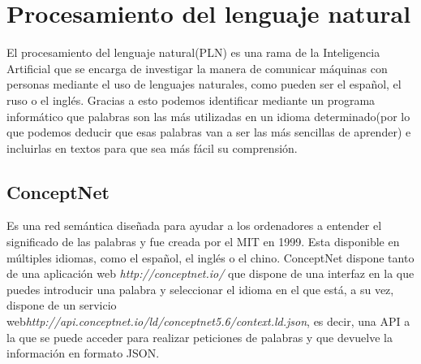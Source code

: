 \section{Procesamiento del lenguaje natural}
El procesamiento del lenguaje natural(PLN) es una rama de la Inteligencia Artificial que se encarga de investigar la manera de comunicar máquinas con personas mediante el uso de lenguajes naturales, como pueden ser el español, el ruso o el inglés. Gracias a esto podemos identificar mediante un programa informático que palabras son las más utilizadas en un idioma determinado(por lo que podemos deducir que esas palabras van a ser las más sencillas de aprender) e incluirlas en textos para que sea más fácil su comprensión.

\subsection{ConceptNet} 

Es una red semántica diseñada para ayudar a los ordenadores a entender el significado de las palabras y fue creada por el MIT en 1999. Esta disponible en múltiples idiomas, como el español, el inglés o el chino. ConceptNet dispone tanto de una aplicación web \textit{http://conceptnet.io/} 
	 que dispone de una interfaz en la que puedes introducir una palabra y seleccionar el idioma en el que está, a su vez, dispone de un servicio web\textit{http://api.conceptnet.io/ld/conceptnet5.6/context.ld.json}, es decir, una API a la que se puede acceder para realizar peticiones de palabras y que devuelve la información en formato JSON.


